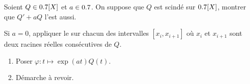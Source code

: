 \begin{exercice}
    Soient $Q \in 0.7[X]$ et $a \in 0.7$. On suppose que $Q$ est scindé sur $0.7[X]$, montrer que $Q'+aQ$ l'est aussi. 
\end{exercice}

\begin{elem_sol}
    Si $a=0$, appliquer le  sur chacun des intervalles $[x_i, x_{i+1}]$ où $x_i$ et $x_{i+1}$ sont deux racines réelles consécutives de $Q$.
    \begin{enumerate} 
        \item Poser $\varphi:t \mapsto \exp(at)Q(t)$.
        \item Démarche à revoir.
    \end{enumerate}
\end{elem_sol}